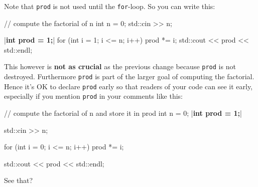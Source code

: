 Note that \texttt{prod} is not used until the \texttt{for}-loop. So you can
write this:

\begin{consolethree}[escapeinside=||]
// compute the factorial of n
int n = 0;
std::cin >> n;

|\textbf{int prod = 1;}|
for (int i = 1; i <= n; i++)
{    
     prod *= i;
}
std::cout << prod << std::endl;
\end{consolethree}

This however is \textbf{not as crucial} as the previous change because \texttt{prod} is not destroyed. Furthermore \texttt{prod} is part of the larger goal of computing the factorial. Hence it's OK to declare \texttt{prod} early so that readers of your code can see it early, especially if you mention \texttt{prod} in your comments like this:

\begin{consolethree}[escapeinside=||]
// compute the factorial of n and store it in prod
int n = 0;
|\textbf{int prod = 1;}|

std::cin >> n;

for (int i = 0; i <= n; i++)
{    
     prod *= i;
}

std::cout << prod << std::endl;
\end{consolethree}

See that?




